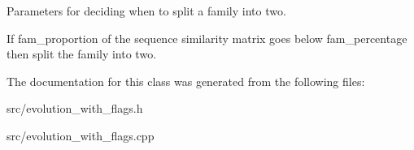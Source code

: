 Parameters for deciding when to split a family into two. 

If {\ttfamily fam\+\_\+proportion} of the sequence similarity matrix goes below {\ttfamily fam\+\_\+percentage} then split the family into two. 

The documentation for this class was generated from the following files\+:\begin{DoxyCompactItemize}
\item 
src/evolution\+\_\+with\+\_\+flags.\+h\item 
src/evolution\+\_\+with\+\_\+flags.\+cpp\end{DoxyCompactItemize}

